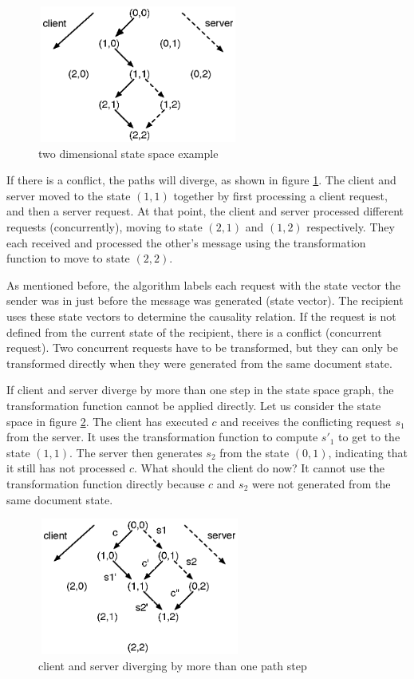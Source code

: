 \begin{figure}[htb]
 \centering
 \includegraphics[width=6.63cm,height=4.5cm]{../images/finalreport/concepts_statespace.eps}
 \caption{two dimensional state space example}
 \label{fig:concepts.statespace}
\end{figure}

If there is a conflict, the paths will diverge, as shown in figure \ref{fig:concepts.statespace}. The client and server moved to the state $(1,1)$ together by first processing a client request, and then a server request. At that point, the client and server processed different requests (concurrently), moving to state $(2,1)$ and $(1,2)$ respectively. They each received and processed the other's message using the transformation function to move to state $(2,2)$.

As mentioned before, the algorithm labels each request with the state vector the
sender was in just before the message was generated (state vector). The 
recipient uses these state vectors to determine the causality relation.
If the request is not defined from the current state of the 
recipient, there is a conflict (concurrent request). Two concurrent requests 
have to be transformed, but they can only be transformed directly when they were 
generated from the same document state.

If client and server diverge by more than one step in the state space graph, the transformation function cannot be applied directly. Let us consider the state space in figure \ref{fig:concepts.statespace2}. The client has executed $c$ and receives the conflicting request $s_1$ from the server. It uses the transformation function to compute $s'_1$ to get to the state $(1,1)$. The server then generates $s_2$ from the state $(0,1)$, indicating that it still has not processed $c$. What should the client do now? It cannot use the transformation function directly because $c$ and $s_2$ were not generated from the same document state.

\begin{figure}[htb]
 \centering
 \includegraphics[width=6.71cm,height=4.5cm]{../images/finalreport/concepts_statespace2.eps}
 \caption{client and server diverging by more than one path step}
 \label{fig:concepts.statespace2}
\end{figure}

